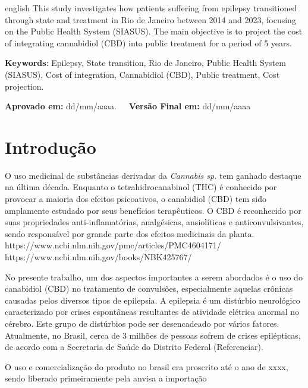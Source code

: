 \documentclass[article,a4paper,12pt,brazil,sumario=tradicional]{abntex2}
\begin{document}
\vspace{-.3cm}
\begin{hyphenrules}{english}
\noindent This study investigates how patients suffering from epilepsy transitioned through state and treatment in Rio de Janeiro between 2014 and 2023, focusing on the Public Health System (SIASUS). The main objective is to project the cost of integrating cannabidiol (CBD) into public treatment for a period of 5 years.
\end{hyphenrules}
\vspace{.4cm}
 
\noindent \textbf{Keywords}: Epilepsy, State transition, Rio de Janeiro, Public Health System (SIASUS), Cost of integration, Cannabidiol (CBD), Public treatment, Cost projection.

\vspace{.4cm}

\noindent \textbf{Aprovado em:} dd/mm/aaaa.~~~\textbf{Versão Final em:} dd/mm/aaaa

\section{Introdução}

O uso medicinal de substâncias derivadas da \textit{Cannabis sp.} tem ganhado destaque na última década. Enquanto o tetrahidrocanabinol (THC) é conhecido por provocar a maioria dos efeitos psicoativos, o canabidiol (CBD) tem sido amplamente estudado por seus benefícios terapêuticos. O CBD é reconhecido por suas propriedades anti-inflamatórias, analgésicas, ansiolíticas e anticonvulsivantes, sendo responsável por grande parte dos efeitos medicinais da planta.
https://www.ncbi.nlm.nih.gov/pmc/articles/PMC4604171/
https://www.ncbi.nlm.nih.gov/books/NBK425767/

No presente trabalho, um dos aspectos importantes a serem abordados é o uso do canabidiol (CBD) no tratamento de convulsões, especialmente aquelas crônicas causadas pelos diversos tipos de epilepsia. A epilepsia é um distúrbio neurológico caracterizado por crises espontâneas resultantes de atividade elétrica anormal no cérebro. Este grupo de distúrbios pode ser desencadeado por vários fatores. Atualmente, no Brasil, cerca de 3 milhões de pessoas sofrem de crises epilépticas, de acordo com a Secretaria de Saúde do Distrito Federal (Referenciar).

O uso e comercialização do produto no brasil era proscrito até o ano de xxxx, sendo liberado primeiramente pela anvisa a importação 
\end{document}
